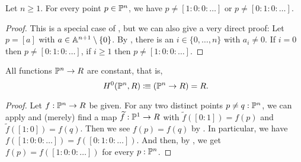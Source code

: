 \begin{lemma}%
  \label{point-in-projective-space-apart-from-two-standard-points}
  Let $n \geq 1$.
  For every point $p \in \mathbb{P}^n$,
  we have $p \neq [1 : 0 : 0 : \dots]$
  or $p \neq [0 : 1 : 0 : \dots]$.
\end{lemma}

\begin{proof}
  This is a special case of ,
  but we can also give a very direct proof:
  Let $p = [a]$ with $a \in \mathbb{A}^{n+1} \setminus \{0\}$.
  By ,
  there is an $i \in \{0, \dots, n\}$ with $a_i \neq 0$.
  If $i = 0$ then $p \neq [0 : 1 : 0 : \dots]$,
  if $i \geq 1$ then $p \neq [1 : 0 : 0 : \dots]$.
\end{proof}

\begin{theorem}%
  \label{functions-on-projective-space-constant}
  All functions $\mathbb{P}^n \to R$ are constant,
  that is,
  \[ H^0(\bP^n, R) \colonequiv (\bP^n \to R) = R \rlap{.} \]
\end{theorem}

\begin{proof}
  Let $f : \mathbb{P}^n \to R$ be given.
  For any two distinct points $p \neq q : \mathbb{P}^n$,
  we can apply 
  and (merely) find a map $\widetilde{f} : \mathbb{P}^1 \to R$
  with $\widetilde{f}([0 : 1]) = f(p)$
  and $\widetilde{f}([1 : 0]) = f(q)$.
  Then we see $f(p) = f(q)$
  by .
  In particular, we have $f([1 : 0 : 0 : \dots]) = f([0 : 1 : 0 : \dots])$.
  And then, by ,
  we get $f(p) = f([1 : 0 : 0 : \dots])$ for every $p : \mathbb{P}^n$.
\end{proof}

